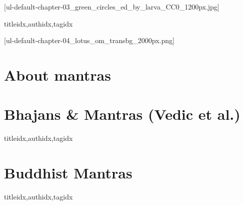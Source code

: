


  \setcounter{chapter}{2}

  [ul-default-chapter-03_green_circles_ed_by_larva_CC0_1200px.jpg]
    \begin{ulSongs}{titleidx,authidx,tagidx}
      
    \end{ulSongs}

  [ul-default-chapter-04_lotus_om_transbg_2000px.png]
    \section{About mantras}
      
    \clearpage\scleardpage
    \section{Bhajans \& Mantras (Vedic et al.)}
      \begin{ulSongs}{titleidx,authidx,tagidx}
        
      \end{ulSongs}
    \scleardpage
    \section{Buddhist Mantras}
      \begin{ulSongs}{titleidx,authidx,tagidx}
        
      \end{ulSongs}

